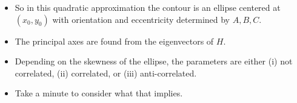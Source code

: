 \documentclass[%
oneside,                 %
final,                   %
10pt]{article}
\begin{document}
\begin{itemize}
\item So in this quadratic approximation the contour is an ellipse centered at $(x_0,y_0)$ with orientation and eccentricity determined by $A,B,C$.

\item The principal axes are found from the eigenvectors of $H$.

\item Depending on the skewness of the ellipse, the parameters are either (i) not correlated, (ii) correlated, or (iii) anti-correlated.

\item Take a minute to consider what that implies.
\end{itemize}

\noindent


\end{document}
